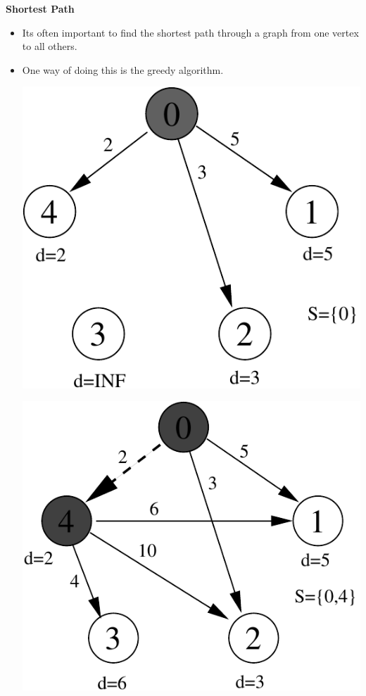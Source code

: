\documentclass[a4,portraitt]{slides}
\begin{document}
\newpage
{\samepage
\begin{center}
{\Large{\bf Shortest Path}}
\end{center}
{\small
\begin{itemize}
\item Its often important to find the shortest path through a graph
from one vertex to all others.
\item One way of doing this is the greedy algorithm.
\vspace*{-1ex}
\begin{center}
\includegraphics{../Images/graphb.pdf}
\end{center}
\vspace*{-1ex}
\begin{center}
\includegraphics{../Images/graphc.pdf}
\end{center}
\end{itemize}
}}
\end{document}
